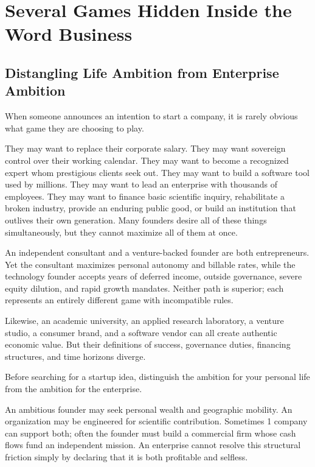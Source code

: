 \section{Several Games Hidden Inside the Word Business}

\subsection{Distangling Life Ambition from Enterprise Ambition}

When someone announces an intention to start a company, it is rarely obvious what game they are choosing to play.

They may want to replace their corporate salary. They may want sovereign control over their working calendar. They may want to become a recognized expert whom prestigious clients seek out. They may want to build a software tool used by millions. They may want to lead an enterprise with thousands of employees. They may want to finance basic scientific inquiry, rehabilitate a broken industry, provide an enduring public good, or build an institution that outlives their own generation. Many founders desire all of these things simultaneously, but they cannot maximize all of them at once.

An independent consultant and a venture-backed founder are both entrepreneurs. Yet the consultant maximizes personal autonomy and billable rates, while the technology founder accepts years of deferred income, outside governance, severe equity dilution, and rapid growth mandates. Neither path is superior; each represents an entirely different game with incompatible rules.

Likewise, an academic university, an applied research laboratory, a venture studio, a consumer brand, and a software vendor can all create authentic economic value. But their definitions of success, governance duties, financing structures, and time horizons diverge.

Before searching for a startup idea, distinguish the ambition for your personal life from the ambition for the enterprise.

An ambitious founder may seek personal wealth and geographic mobility. An organization may be engineered for scientific contribution. Sometimes 1 company can support both; often the founder must build a commercial firm whose cash flows fund an independent mission. An enterprise cannot resolve this structural friction simply by declaring that it is both profitable and selfless.

